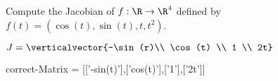 \documentclass{ximera}
\begin{document}
	\begin{question}	
		Compute the Jacobian of $f:\R \to \R^4$ defined by $f(t) = (\cos(t),\sin(t),t,t^2)$.
		\begin{solution}
		\begin{hint}
			\(J = \verticalvector{-\sin(r)\\ \cos(t) \\ 1 \\ 2t}\)
		\end{hint}
		\begin{matrix-answer}[name=J]
			correct-Matrix  = [['-sin(t)'],['cos(t)'],['1'],['2t']]
		\end{matrix-answer}
		\end{solution}
	\end{question}
\end{document}
